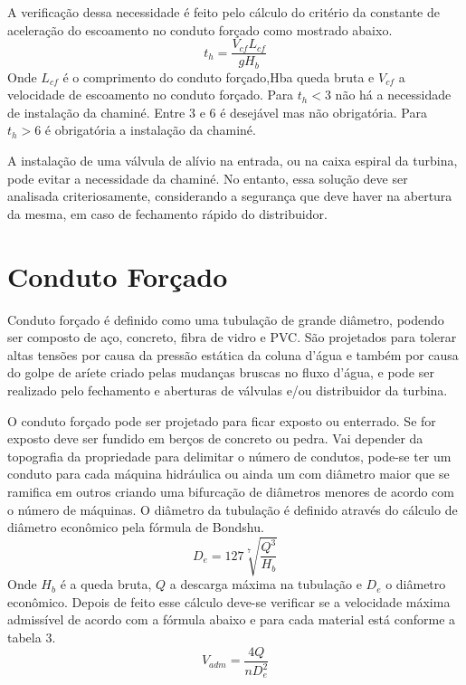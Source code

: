 A verificação dessa necessidade é feito pelo cálculo do critério da constante de aceleração do escoamento no conduto forçado como mostrado abaixo.
\begin{equation}
t_h = \dfrac{V_{cf}L_{cf}}{gH_b}
\end{equation}
Onde $L_{cf}$ é o comprimento do conduto forçado,Hba queda bruta e $V_{cf}$ a velocidade de escoamento no conduto forçado. Para $t_h < 3$ não há a necessidade de instalação da chaminé. Entre $3$ e $6$ é desejável mas não obrigatória. Para $t_h> 6$  é obrigatória a instalação da chaminé.

A instalação de uma válvula de alívio na entrada, ou na caixa espiral da turbina, pode evitar a necessidade da chaminé. No entanto, essa solução deve ser analisada criteriosamente, considerando a segurança que deve haver na abertura da mesma, em caso de fechamento rápido do distribuidor.

\section{Conduto Forçado}
Conduto forçado é definido como uma tubulação de grande diâmetro, podendo ser composto de aço, concreto, fibra de vidro e PVC. São projetados para tolerar altas tensões por causa da pressão estática da coluna d’água e também por causa do golpe de aríete criado pelas mudanças bruscas no fluxo d’água, e pode ser realizado pelo fechamento e aberturas de válvulas e/ou distribuidor da turbina.

O conduto forçado pode ser projetado para ficar exposto ou enterrado. Se for exposto deve ser fundido em berços de concreto ou pedra. Vai depender da topografia da propriedade para delimitar o número de condutos, pode-se ter um conduto para cada máquina hidráulica ou ainda um com diâmetro maior que se ramifica em outros criando uma bifurcação de diâmetros menores de acordo com o número de máquinas.
O diâmetro da tubulação é definido através do cálculo de diâmetro econômico pela fórmula de Bondshu.
\begin{equation}
	D_e = 127\sqrt[7]{\dfrac{Q^3}{H_b}}
\end{equation}
Onde $H_b$ é a queda bruta, $Q$ a descarga máxima na tubulação e $D_e$ o diâmetro econômico. Depois de feito esse cálculo deve-se verificar se a velocidade máxima admissível de acordo com a fórmula abaixo e para cada material está conforme a tabela 3.
\begin{equation}
	V_{adm} = \dfrac{4Q}{nD^2_e}
\end{equation}

